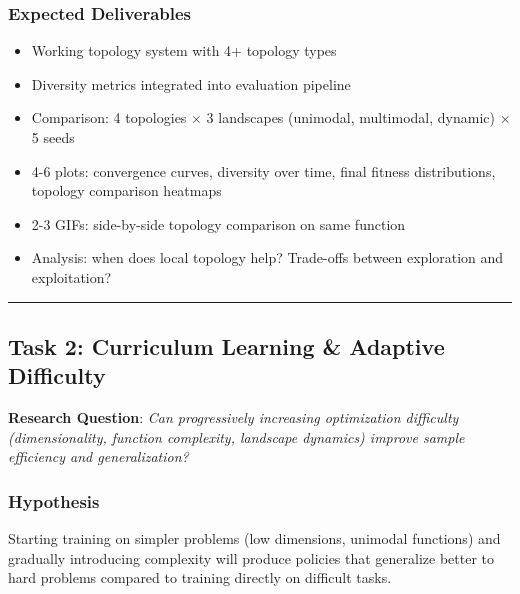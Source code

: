 \documentclass[11pt,a4paper]{scrartcl}
\newcommand{\sectiondivider}{%
  \vspace{0.2em}%
  \noindent\textcolor{rulecolor}{\rule{0.3\textwidth}{0.4pt}}%
  \vspace{0.3em}%
}
\begin{document}
\subsubsection*{Expected Deliverables}
\begin{itemize}
    \item Working topology system with 4+ topology types
    \item Diversity metrics integrated into evaluation pipeline
    \item Comparison: 4 topologies $\times$ 3 landscapes (unimodal, multimodal, dynamic) $\times$ 5 seeds
    \item 4-6 plots: convergence curves, diversity over time, final fitness distributions, topology comparison heatmaps
    \item 2-3 GIFs: side-by-side topology comparison on same function
    \item Analysis: when does local topology help? Trade-offs between exploration and exploitation?
\end{itemize}

\sectiondivider

\subsection*{Task 2: Curriculum Learning \& Adaptive Difficulty}

\textbf{Research Question}: \textit{Can progressively increasing optimization difficulty (dimensionality, function complexity, landscape dynamics) improve sample efficiency and generalization?}

\subsubsection*{Hypothesis}
Starting training on simpler problems (low dimensions, unimodal functions) and gradually introducing complexity will produce policies that generalize better to hard problems compared to training directly on difficult tasks.
\end{document}
